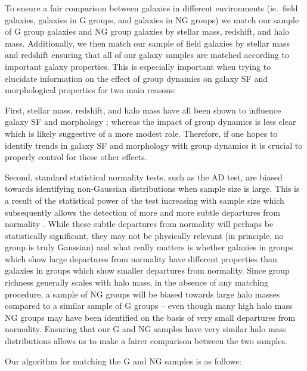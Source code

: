 \documentclass[a4paper,fleqn,usenatbib]{mnras}
\begin{document}
To ensure a fair comparison between galaxies in different environments
(ie.\ field galaxies, galaxies in G groups, and galaxies in NG groups)
we match our sample of G group galaxies and NG group galaxies by
stellar mass, redshift, and halo mass.  Additionally, we then match
our sample of field galaxies by stellar mass and redshift ensuring
that all of our galaxy samples are matched according to important galaxy
properties.  This is especially important when trying to elucidate
information on the effect of group dynamics on galaxy SF and
morphological properties for
two main reasons:
\par
First, stellar mass, redshift, and halo mass have
all been shown to influence galaxy SF and morphology
\citep[e.g.][]{brinchmann2004, feulner2005, zheng2007, cucciati2012,
  wetzel2012, lackner2013, tasca2014}; whereas
the impact of group dynamics is less clear \citep{hou2013,
  ribeiro2013} which is likely suggestive of a more modest role.
Therefore,
if one hopes to identify trends in galaxy SF and morphology with group
dynamics it is crucial to properly control for these other effects.
\par
Second, standard statistical normality tests, such as the AD test, are
biased towards identifying non-Gaussian distributions when
sample size is large.  This is a result of the statistical power of
the test increasing with sample size which subsequently allows the
detection of more and more subtle departures from normality
\citep{razali2011}.  While these subtle departures from normality will
perhaps be statistically significant, they may not be physically relevant (in
principle, no group is truly Gaussian) and what really matters is
whether galaxies in groups which show large departures from normality
have different properties than galaxies in groups which show smaller
departures from normality. Since group
richness generally scales with halo mass, in the absence of any matching
procedure, a sample of NG groups will be biased towards large halo
masses compared to a similar sample of G groups -- even though many
high halo mass NG groups may have been identified on the basis of very
small departures from normality.  Ensuring that our G and NG
samples have very similar halo mass distributions allows us to make a
fairer comparison between the two samples.
\par
Our algorithm for matching the G and NG samples is as follows:
\end{document}
